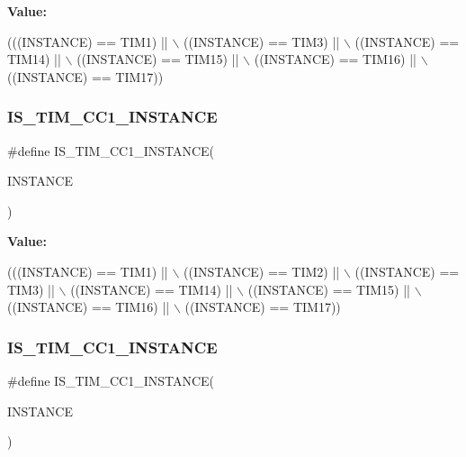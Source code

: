 {\bfseries Value\+:}
\begin{DoxyCode}
(((INSTANCE) == TIM1)    || \(\backslash\)
   ((INSTANCE) == TIM3)    || \(\backslash\)
   ((INSTANCE) == TIM14)   || \(\backslash\)
   ((INSTANCE) == TIM15)   || \(\backslash\)
   ((INSTANCE) == TIM16)   || \(\backslash\)
   ((INSTANCE) == TIM17))
\end{DoxyCode}
\mbox{\label{group___exported__macro_ga0c02efc77b1bfb640d7f6593f58ad464}} 
\subsubsection{\texorpdfstring{I\+S\+\_\+\+T\+I\+M\+\_\+\+C\+C1\+\_\+\+I\+N\+S\+T\+A\+N\+CE}{IS\_TIM\_CC1\_INSTANCE}\hspace{0.1cm}{\footnotesize\ttfamily [8/16]}}
{\footnotesize\ttfamily \#define I\+S\+\_\+\+T\+I\+M\+\_\+\+C\+C1\+\_\+\+I\+N\+S\+T\+A\+N\+CE(\begin{DoxyParamCaption}\item[{}]{I\+N\+S\+T\+A\+N\+CE }\end{DoxyParamCaption})}

{\bfseries Value\+:}
\begin{DoxyCode}
(((INSTANCE) == TIM1)    || \(\backslash\)
   ((INSTANCE) == TIM2)    || \(\backslash\)
   ((INSTANCE) == TIM3)    || \(\backslash\)
   ((INSTANCE) == TIM14)   || \(\backslash\)
   ((INSTANCE) == TIM15)   || \(\backslash\)
   ((INSTANCE) == TIM16)   || \(\backslash\)
   ((INSTANCE) == TIM17))
\end{DoxyCode}
\mbox{\label{group___exported__macro_ga0c02efc77b1bfb640d7f6593f58ad464}} 
\subsubsection{\texorpdfstring{I\+S\+\_\+\+T\+I\+M\+\_\+\+C\+C1\+\_\+\+I\+N\+S\+T\+A\+N\+CE}{IS\_TIM\_CC1\_INSTANCE}\hspace{0.1cm}{\footnotesize\ttfamily [9/16]}}
{\footnotesize\ttfamily \#define I\+S\+\_\+\+T\+I\+M\+\_\+\+C\+C1\+\_\+\+I\+N\+S\+T\+A\+N\+CE(\begin{DoxyParamCaption}\item[{}]{I\+N\+S\+T\+A\+N\+CE }\end{DoxyParamCaption})}


